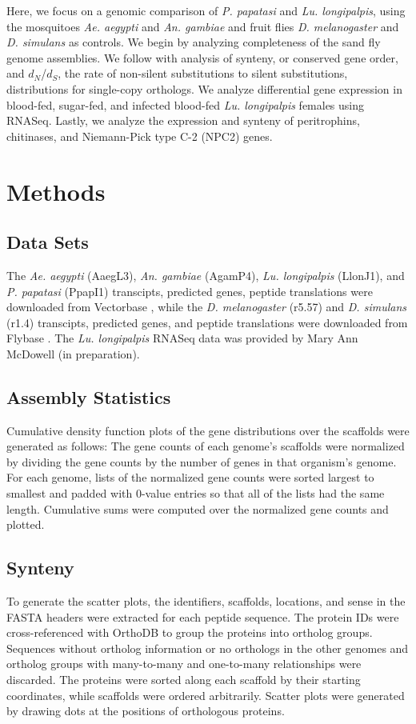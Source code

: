 Here, we focus on a genomic comparison of \emph{P. papatasi} and \emph{Lu. longipalpis}, using the mosquitoes \emph{Ae. aegypti} and \emph{An. gambiae} and fruit flies \emph{D. melanogaster} and \emph{D. simulans} as controls.  We begin by analyzing completeness of the sand fly genome assemblies.  We follow with analysis of synteny, or conserved gene order, and $d_N$/$d_S$, the rate of non-silent substitutions to silent substitutions, distributions for single-copy orthologs.  We analyze differential gene expression in blood-fed, sugar-fed, and infected blood-fed \emph{Lu. longipalpis} females using RNASeq.  Lastly, we analyze the expression and synteny of peritrophins, chitinases, and Niemann-Pick type C-2 (NPC2) genes.

\section{Methods}

\subsection{Data Sets}
The \emph{Ae. aegypti} (AaegL3), \emph{An. gambiae} (AgamP4), \emph{Lu. longipalpis} (LlonJ1), and \emph{P. papatasi} (PpapI1) transcipts, predicted genes, peptide translations were downloaded from Vectorbase \cite{Lawson2007,Lawson2009}, while the \emph{D. melanogaster} (r5.57) and \emph{D. simulans} (r1.4) transcipts, predicted genes, and peptide translations were downloaded from Flybase \cite{Gelbart1997,Crosby2007,Tweedie2009}.  The \emph{Lu. longipalpis} RNASeq data was provided by Mary Ann McDowell (in preparation).

\subsection{Assembly Statistics}
Cumulative density function plots of the gene distributions over the scaffolds were generated as follows: The gene counts of each genome's scaffolds were normalized by dividing the gene counts by the number of genes in that organism's genome. For each genome, lists of the normalized gene counts were sorted largest to smallest and padded with 0-value entries so that all of the lists had the same length.  Cumulative sums were computed over the normalized gene counts and plotted.

\subsection{Synteny}
To generate the scatter plots, the identifiers, scaffolds, locations, and sense in the FASTA headers were extracted for each peptide sequence.  The protein IDs were cross-referenced with OrthoDB to group the proteins into ortholog groups.  Sequences without ortholog information or no orthologs in the other genomes and ortholog groups with many-to-many and one-to-many relationships were discarded.  The proteins were sorted along each scaffold by their starting coordinates, while scaffolds were ordered arbitrarily.  Scatter plots were generated by drawing dots at the positions of orthologous proteins.

